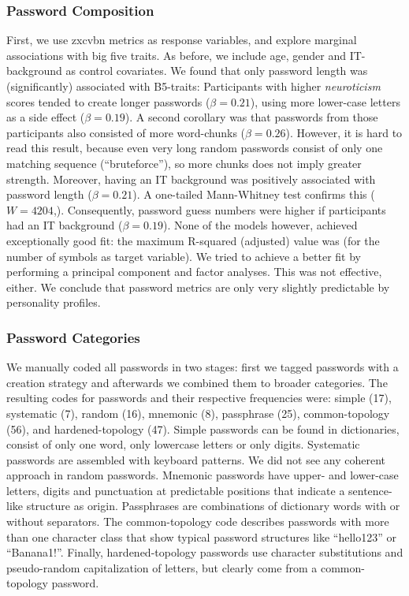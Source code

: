 \subsubsection{Password Composition}
First, we use zxcvbn metrics as response variables, and explore marginal associations with big five traits. As before, we include age, gender and IT-background as control covariates. We found that only password length was (significantly) associated with B5-traits: Participants with higher \textit{neuroticism} scores tended to create longer passwords ($\beta = 0.21$), using more lower-case letters as a side effect ($\beta = 0.19$). A second corollary was that passwords from those participants also consisted of more word-chunks ($\beta= 0.26$). However, it is hard to read this result, because even very long random passwords consist of only one matching sequence (``bruteforce''), so more chunks does not imply greater strength. 
Moreover, having an IT background was positively associated with password length ($\beta = 0.21$). A one-tailed Mann-Whitney test confirms this ($W=4204$,). Consequently, password guess numbers were higher if participants had an IT background ($\beta=0.19$). None of the models however, achieved exceptionally good fit: the maximum R-squared (adjusted) value was  (for the number of symbols as target variable). We tried to achieve a better fit by performing a principal component and factor analyses. This was not effective, either. We conclude that password metrics are only very slightly predictable by personality profiles. 


\subsubsection{Password Categories}
We manually coded all passwords in two stages: first we tagged passwords with a creation strategy and afterwards we combined them to broader categories. The resulting codes for passwords and their respective frequencies were: simple (17), systematic (7), random (16), mnemonic (8), passphrase (25), common-topology (56), and hardened-topology (47). Simple passwords can be found in dictionaries, consist of only one word, only lowercase letters or only digits. Systematic passwords are assembled with keyboard patterns. We did not see any coherent approach in random passwords. Mnemonic passwords have upper- and lower-case letters, digits and punctuation at predictable positions that indicate a sentence-like structure as origin. Passphrases are combinations of dictionary words with or without separators. The common-topology code describes passwords with more than one character class that show typical password structures like ``hello123'' or ``Banana1!''. Finally, hardened-topology passwords use character substitutions and pseudo-random capitalization of letters, but clearly come from a common-topology password. 

